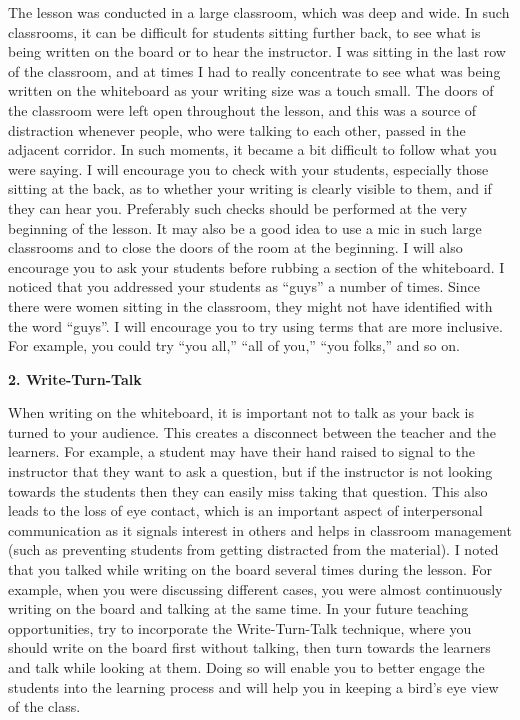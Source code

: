 \documentclass{article}
\begin{document}
The lesson was conducted in a large classroom, which was deep and wide. In such classrooms, it can be difficult for students sitting further back, to see what is being written on the board or to hear the instructor. I was sitting in the last row of the classroom, and at times I had to really concentrate to see what was being written on the whiteboard as your writing size was a touch small. The doors of the classroom were left open throughout the lesson, and this was a source of distraction whenever people, who were talking to each other, passed in the adjacent corridor. In such moments, it became a bit difficult to follow what you were saying. I will encourage you to check with your students, especially those sitting at the back, as to whether your writing is clearly visible to them, and if they can hear you. Preferably such checks should be performed at the very beginning of the lesson. It may also be a good idea to use a mic in such large classrooms and to close the doors of the room at the beginning. I will also encourage you to ask your students before rubbing a section of the whiteboard. I noticed that you addressed your students as “guys” a number of times. Since there were women sitting in the classroom, they
might not have identified with the word “guys”. I will encourage you to try using terms that are more inclusive. For example, you could try “you all,” “all of you,” “you folks,” and so on.

\textbf{2. Write-Turn-Talk}

When writing on the whiteboard, it is important not to talk as your back is turned to your audience. This creates a disconnect between the teacher and the learners. For example, a student may have their hand raised to signal to the instructor that they want to ask a question, but if the instructor is not looking towards the students then they can easily miss taking that question. This also leads to the loss of eye contact, which is an important aspect of interpersonal communication as it signals interest in others and helps in classroom management (such as preventing students from getting distracted from the material). I noted that you talked while writing on the board several times during the lesson. For example, when you were discussing different cases, you were almost continuously writing on the board and talking at the same time. In your future teaching opportunities, try to incorporate the Write-Turn-Talk technique, where you should write on the board first without talking, then turn towards the learners and talk while looking at them. Doing so will enable you to better engage the students into the learning process and will help you in keeping a bird’s eye view of the class.
\end{document}
